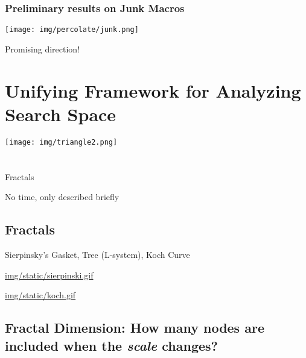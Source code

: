 \subsubsection{Preliminary results on Junk Macros}
\label{sec-15-10-1}

\texttt{[image: img/percolate/junk.png]}

\begin{alignright}
Promising direction!
\end{alignright}

\section{Unifying Framework for Analyzing Search Space}
\label{sec-16}

\texttt{[image: img/triangle2.png]}

\section{}
\label{sec-17}

\begin{xlarge}
\begin{center}
Fractals
\end{center}
\end{xlarge}

\begin{alignright}
No time, only described briefly
\end{alignright}

\subsection{Fractals}
\label{sec-17-1}

Sierpinsky's Gasket, Tree (L-system), Koch Curve


\begin{container-fluid}
\begin{row-fluid}
\begin{span6}
\url{img/static/sierpinski.gif}
\end{span6}
\begin{span6}
\url{img/static/koch.gif}
\end{span6}
\end{row-fluid}
\end{container-fluid}


\subsection{Fractal Dimension: How many nodes are included when the \textbf{\emph{scale}} changes?}
\label{sec-17-2}

